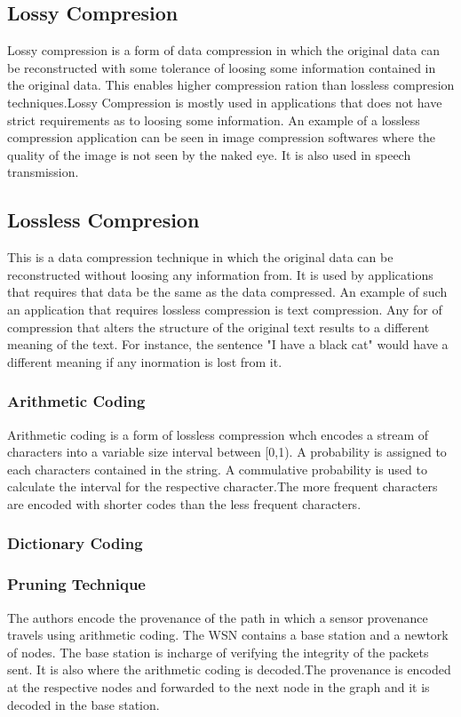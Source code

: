 \subsection{Lossy Compresion}

Lossy compression is a form of data compression in which the original data can be reconstructed with some tolerance of loosing some information contained in the original data. This enables higher compression ration than lossless compresion techniques.Lossy Compression is mostly used in applications that does not have strict requirements as to loosing some information. An example of a lossless compression application can be seen in image compression softwares where the quality of the image is not seen by the naked eye. It is also used in speech transmission. 

\subsection{Lossless Compresion}
This is a data compression technique in which the original data can be reconstructed without loosing any information from. It is used by applications that requires that data be the same as the data compressed. An example of such an application that requires lossless compression is text compression.  Any for of compression that alters the structure of the original text results to a different meaning of the text. For instance, the sentence "I have a black cat" would have a different meaning if any inormation is lost from it.



\subsubsection{Arithmetic Coding}

Arithmetic coding is a form of lossless compression whch encodes a stream of characters into a variable size interval between [0,1). A probability is assigned to each characters contained in the string. A commulative probability is used to calculate the interval for the respective character.The more frequent characters are encoded with shorter codes than the less frequent characters. 

\subsubsection{Dictionary Coding}



\subsubsection{Pruning Technique} 
The authors encode the provenance of the path in which a sensor provenance travels using arithmetic coding. The WSN contains a base station and a newtork of nodes. The base station is incharge of verifying the integrity of the packets sent. It is also where the arithmetic coding is decoded.The provenance is encoded at the respective nodes and forwarded to the next node in the graph and it is decoded in the base station. 

